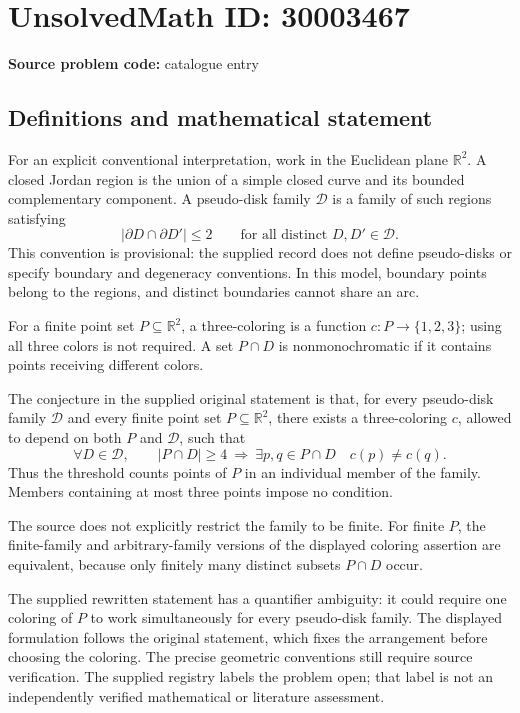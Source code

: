 \documentclass[11pt]{article}
\newcommand{\R}{\mathbb{R}}
\begin{document}
\section*{UnsolvedMath ID: 30003467}
\textbf{Source problem code:} catalogue entry
\subsection{Definitions and mathematical statement}
For an explicit conventional interpretation, work in the Euclidean plane \(\R^2\). A closed Jordan region is the union of a simple closed curve and its bounded complementary component. A pseudo-disk family \(\mathcal D\) is a family of such regions satisfying
\[
\lvert\partial D\cap\partial D'\rvert\leq 2
\qquad\text{for all distinct }D,D'\in\mathcal D.
\]
This convention is provisional: the supplied record does not define pseudo-disks or specify boundary and degeneracy conventions. In this model, boundary points belong to the regions, and distinct boundaries cannot share an arc.

For a finite point set \(P\subseteq\R^2\), a three-coloring is a function \(c:P\to\{1,2,3\}\); using all three colors is not required. A set \(P\cap D\) is nonmonochromatic if it contains points receiving different colors.

The conjecture in the supplied original statement is that, for every pseudo-disk family \(\mathcal D\) and every finite point set \(P\subseteq\R^2\), there exists a three-coloring \(c\), allowed to depend on both \(P\) and \(\mathcal D\), such that
\[
\forall D\in\mathcal D,\qquad
\lvert P\cap D\rvert\geq 4
\ \Longrightarrow\
\exists p,q\in P\cap D\quad c(p)\neq c(q).
\]
Thus the threshold counts points of \(P\) in an individual member of the family. Members containing at most three points impose no condition.

The source does not explicitly restrict the family to be finite. For finite \(P\), the finite-family and arbitrary-family versions of the displayed coloring assertion are equivalent, because only finitely many distinct subsets \(P\cap D\) occur.

The supplied rewritten statement has a quantifier ambiguity: it could require one coloring of \(P\) to work simultaneously for every pseudo-disk family. The displayed formulation follows the original statement, which fixes the arrangement before choosing the coloring. The precise geometric conventions still require source verification. The supplied registry labels the problem open; that label is not an independently verified mathematical or literature assessment.
\end{document}
